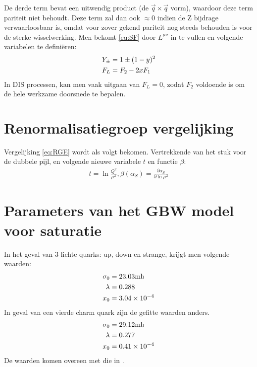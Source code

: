 \documentclass[a4paper,11pt]{article}
\numberwithin{equation}{section} %
\begin{document}
De derde term bevat een uitwendig product (de $\vec{q} \times \vec{q}$ vorm), waardoor deze term pariteit niet behoudt.
Deze term zal dan ook $\approx 0$ indien de Z bijdrage verwaarloosbaar is, omdat voor zover gekend pariteit nog steeds behouden is voor de sterke wisselwerking.
Men bekomt \eqref{eq:SF} door $L^{\mu \nu}$ in te vullen en volgende variabelen te definiëren:
\begin{align}
Y_\pm &= 1 \pm (1-y)^2 \notag \\
F_L &= F_2 - 2x F_1 \notag
\end{align}
In DIS processen, kan men vaak uitgaan van $F_L = 0$, zodat $F_2$ voldoende is om de hele werkzame doorsnede te bepalen.

\section{Renormalisatiegroep vergelijking} \label{app:RGE}
Vergelijking \eqref{eq:RGE} wordt als volgt bekomen. Vertrekkende van het stuk voor de dubbele pijl, en volgende nieuwe variabele $t$ en functie $\beta$:
\begin{align}
t = \ln{\frac{Q^2}{\mu^2}}, \beta(\alpha_S) =  \frac{\partial \alpha_S}{\partial \ln{\mu^2}}
\end{align}

\section{Parameters van het GBW model voor saturatie} \label{app:GBWparameters}
In het geval van 3 lichte quarks: up, down en strange, krijgt men volgende waarden:
\begin{align}
\sigma_0 &= 23.03 \text{mb} \notag \\
\lambda &= 0.288 \\
x_0 &= 3.04 \times 10^{-4} \notag
\end{align}
In geval van een vierde charm quark zijn de gefitte waarden anders.
\begin{align}
\sigma_0 &= 29.12 \text{mb} \notag \\
\lambda &= 0.277 \\
x_0 &= 0.41 \times 10^{-4} \notag
\end{align}
De waarden komen overeen met die in \cite{GBW}.
\end{document}
